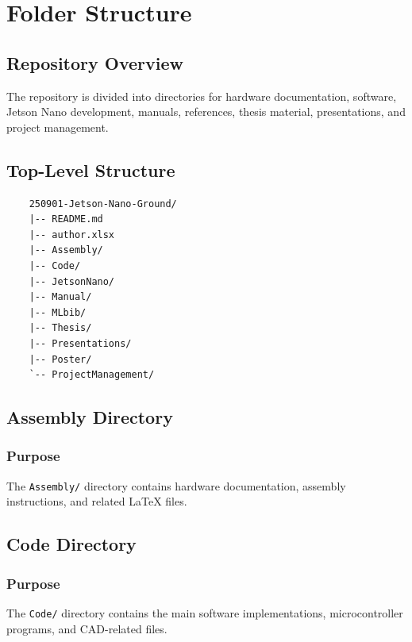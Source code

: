%
%
\chapter{Folder Structure}

\section{Repository Overview}

The repository is divided into directories for hardware documentation, software, Jetson Nano development, manuals, references, thesis material, presentations, and project management.

\section{Top-Level Structure}

\begin{verbatim}
	250901-Jetson-Nano-Ground/
	|-- README.md
	|-- author.xlsx
	|-- Assembly/
	|-- Code/
	|-- JetsonNano/
	|-- Manual/
	|-- MLbib/
	|-- Thesis/
	|-- Presentations/
	|-- Poster/
	`-- ProjectManagement/
\end{verbatim}

\section{Assembly Directory}

\subsection{Purpose}

The \texttt{Assembly/} directory contains hardware documentation, assembly instructions, and related \LaTeX{} files.

\section{Code Directory}

\subsection{Purpose}

The \texttt{Code/} directory contains the main software implementations, microcontroller programs, and CAD-related files.

